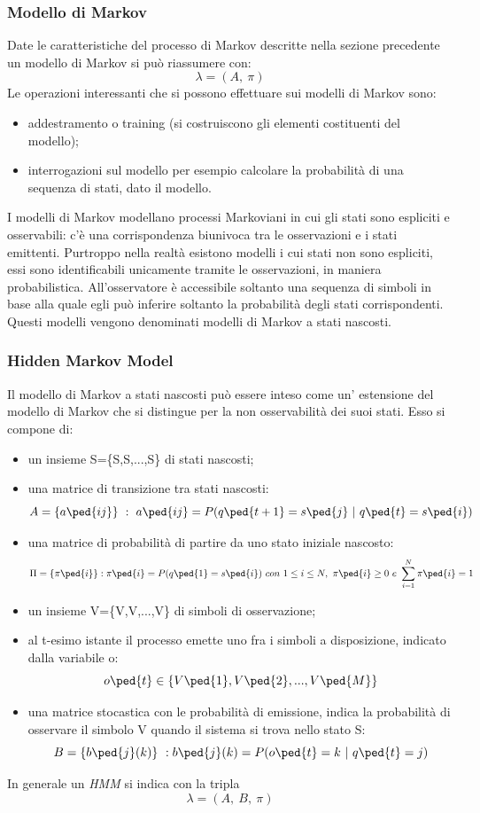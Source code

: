 \subsubsection*{Modello di Markov}
\label{3.3.2.2}
Date le caratteristiche del processo di Markov descritte nella sezione precedente un modello di Markov si può riassumere con:
\[\lambda=(A,\ \pi)\]
Le operazioni interessanti che si possono effettuare sui modelli di Markov sono:
\begin{itemize}
\item addestramento o training (si costruiscono gli elementi costituenti del modello);
\item interrogazioni sul modello per esempio calcolare la probabilità di una sequenza di stati, dato il modello.
\end{itemize}
I modelli di Markov modellano processi Markoviani in cui gli stati sono espliciti e osservabili: c'è una corrispondenza biunivoca tra le osservazioni e i stati emittenti. Purtroppo nella realtà esistono modelli i cui stati non sono espliciti, essi sono identificabili unicamente tramite le osservazioni, in maniera probabilistica. All'osservatore è accessibile soltanto una sequenza di simboli in base alla quale egli può inferire soltanto la probabilità degli stati corrispondenti. Questi modelli vengono denominati modelli di Markov a stati nascosti.
\subsubsection*{Hidden Markov Model}
\label{3.3.2.3}
Il modello di Markov a stati nascosti può essere inteso come un' estensione del modello di Markov che si distingue per la non osservabilità dei suoi stati. Esso si compone di:
\begin{itemize}
\item un insieme S=\{S,S,...,S\} di stati nascosti;
\item una matrice di transizione tra stati nascosti:
\[ A=\{a\ped{ij}\}\ :\ a\ped{ij}=P(q\ped{t+1}=s\ped{j}\ |\ q\ped{t}=s\ped{i})\]
\item una matrice di probabilità di partire da uno stato iniziale nascosto:
\[ \Pi =\{\pi\ped{i}\}: \pi\ped{i}=P(q\ped{1} = s\ped{i})\ con\ 1\le i\le N,\  \pi\ped{i}\ge 0\  e\  \sum\limits_{i=1}^N \pi\ped{i} = 1 \]
\item un insieme V=\{V,V,...,V\} di simboli di osservazione;
\item al t-esimo istante il processo emette uno fra i simboli a disposizione, indicato dalla variabile o:
\[o\ped{t} \in\{V\ped{1},V\ped{2},...,V\ped{M}\}\]
\item una matrice stocastica con le probabilità di emissione, indica la probabilità di osservare il simbolo V quando il sistema si trova nello stato S:
\[ B=\{b\ped{j}(k)\}\ : b\ped{j}(k)=P(o\ped{t}=k\ |\ q\ped{t}=j)\]
\end{itemize}
In generale un \emph{HMM} si indica con la tripla
\[ \lambda=(A,\ B,\ \pi)\]
